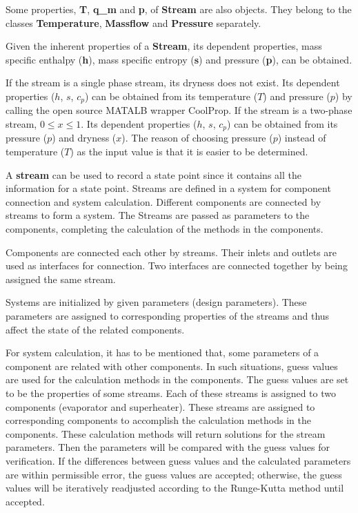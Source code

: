 Some properties, \textbf{T}, \textbf{q\_m} and \textbf{p}, of \textbf{Stream} are also objects. They belong to the classes \textbf{Temperature}, \textbf{Massflow} and \textbf{Pressure} separately.

Given the inherent properties of a \textbf{Stream}, its dependent properties, mass specific enthalpy (\textbf{h}), mass specific entropy (\textbf{s}) and pressure (\textbf{p}), can be obtained.

If the stream is a single phase stream, its dryness does not exist. Its dependent properties ($h$, $s$, $c_p$) can be obtained from its temperature ($T$) and pressure ($p$) by calling the open source MATALB wrapper CoolProp. If the stream is a two-phase stream, $0 \leqslant x \leqslant 1$. Its dependent properties ($h$, $s$, $c_p$) can be obtained from its pressure ($p$) and dryness ($x$). The reason of choosing pressure ($p$) instead of temperature ($T$) as the input value is that it is easier to be determined.

A \textbf{stream} can be used to record a state point since it contains all the information for a state point. Streams are defined in a system for component connection and system calculation. Different components are connected by streams to form a system. The Streams are passed as parameters to the components, completing the calculation of the methods in the components.

Components are connected each other by streams. Their inlets and outlets are used as interfaces for connection. 
Two interfaces are connected together by being assigned the same stream.

Systems are initialized by given parameters (design parameters). These parameters are assigned to corresponding properties of the streams and thus affect the state of the related components.

For system calculation, it has to be mentioned that, some parameters of a component are related with other components. 
In such situations, guess values are used for the calculation methods in the components.
The guess values are set to be the properties of some streams. Each of these streams is assigned to two components (evaporator and superheater). These streams are assigned to corresponding components to accomplish the calculation methods in the components. These calculation methods will return solutions for the stream parameters. Then the parameters will be compared with the guess values for verification. If the differences between guess values and the calculated parameters are within permissible error, the guess values are accepted; otherwise, the guess values will be iteratively readjusted according to the Runge-Kutta method until accepted.

